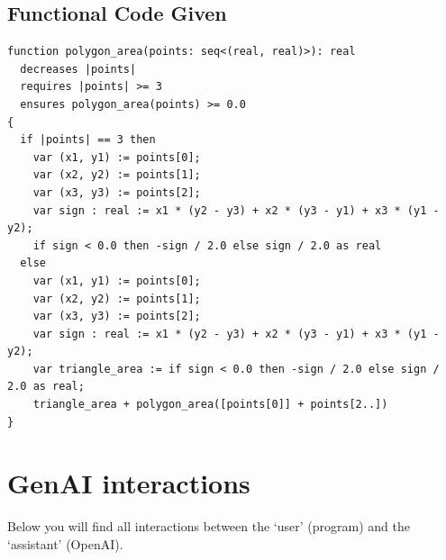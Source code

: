 \documentclass{article}
\begin{document}
\subsection*{Functional Code Given}
\begin{lstlisting}
function polygon_area(points: seq<(real, real)>): real
  decreases |points|
  requires |points| >= 3
  ensures polygon_area(points) >= 0.0
{
  if |points| == 3 then 
    var (x1, y1) := points[0];
    var (x2, y2) := points[1];
    var (x3, y3) := points[2];
    var sign : real := x1 * (y2 - y3) + x2 * (y3 - y1) + x3 * (y1 - y2);
    if sign < 0.0 then -sign / 2.0 else sign / 2.0 as real 
  else 
    var (x1, y1) := points[0];
    var (x2, y2) := points[1];
    var (x3, y3) := points[2];
    var sign : real := x1 * (y2 - y3) + x2 * (y3 - y1) + x3 * (y1 - y2);
    var triangle_area := if sign < 0.0 then -sign / 2.0 else sign / 2.0 as real;
    triangle_area + polygon_area([points[0]] + points[2..])
}
\end{lstlisting}
\clearpage
\section*{GenAI interactions}
Below you will find all interactions between the `user' (program) and the `assistant' (OpenAI).
\end{document}
